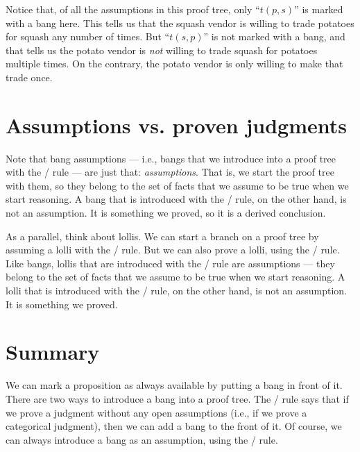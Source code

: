 \documentclass[../../../main.tex]{subfiles}
\begin{document}
Notice that, of all the assumptions in this proof tree, only ``$t(p, s)$'' is marked with a bang here. This tells us that the squash vendor is willing to trade potatoes for squash any number of times. But ``$t(s, p)$'' is not marked with a bang, and that tells us the potato vendor is \emph{not} willing to trade squash for potatoes multiple times. On the contrary, the potato vendor is only willing to make that trade once.


\section{Assumptions vs. proven judgments}

Note that bang assumptions --- i.e., bangs that we introduce into a proof tree with the \startrule/ rule --- are just that: \emph{assumptions}. That is, we start the proof tree with them, so they belong to the set of facts that we assume to be true when we start reasoning. A bang that is introduced with the \bangIntro/ rule, on the other hand, is not an assumption. It is something we proved, so it is a derived conclusion.

As a parallel, think about lollis. We can start a branch on a proof tree by assuming a lolli with the \startrule/ rule. But we can also prove a lolli, using the \lolliIntro/ rule. Like bangs, lollis that are introduced with the \startrule/ rule are assumptions --- they belong to the set of facts that we assume to be true when we start reasoning. A lolli that is introduced with the \lolliIntro/ rule, on the other hand, is not an assumption. It is something we proved.



\section{Summary}

We can mark a proposition as always available by putting a bang in front of it. There are two ways to introduce a bang into a proof tree. The \bangIntro/ rule says that if we prove a judgment without any open assumptions (i.e., if we prove a categorical judgment), then we can add a bang to the front of it. Of course, we can always introduce a bang as an assumption, using the \startrule/ rule. 
\end{document}
